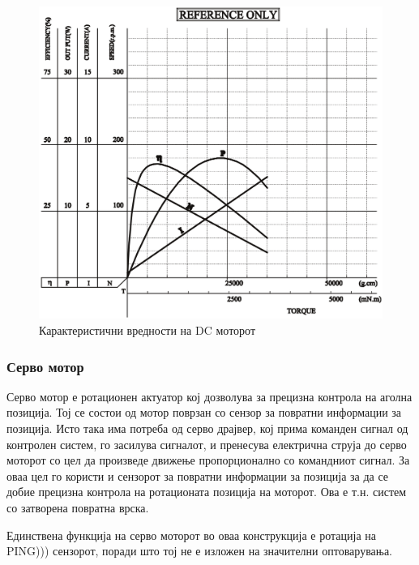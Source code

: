 \documentclass[12pt]{article}
\begin{document}
	    \begin{figure}[H]
		    \includegraphics[width=0.75\linewidth]{./images/motor_graph.png}
		    \centering
		    \caption{Карактеристични вредности на DC моторот}
		    \label{fig:motor_graph.png}
	      \end{figure}

    \subsubsection{Серво мотор}
      Серво мотор е ротационен актуатор кој дозволува за прецизна контрола на аголна позиција. Тој се состои од мотор поврзан со сензор за повратни информации за позиција. Исто така има потреба од серво драјвер, кој прима команден сигнал од контролен систем, го засилува сигналот, и пренесува електрична струја до серво моторот со цел да произведе движење пропорционално со командниот сигнал. За оваа цел го користи и сензорот за повратни информации за позиција за да се добие прецизна контрола на ротационата позиција на моторот. Ова е т.н. систем со затворена повратна врска.

      Единствена функција на серво моторот во оваа конструкција е ротација на PING))) сензорот, поради што тој не е изложен на значителни оптоварувања.
\end{document}
